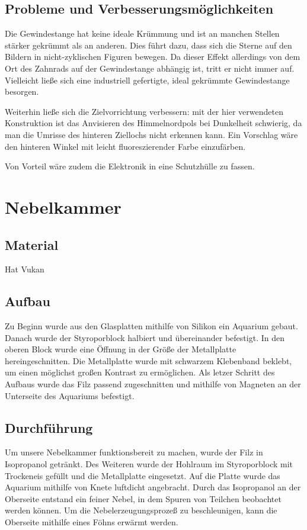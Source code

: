 \subsection{Probleme und Verbesserungsmöglichkeiten}

Die Gewindestange hat keine ideale Krümmung und ist an manchen Stellen stärker
gekrümmt als an anderen. Dies führt dazu, dass sich die Sterne auf den Bildern
in nicht-zyklischen Figuren bewegen. Da dieser Effekt allerdings von dem Ort des
Zahnrads auf der Gewindestange abhängig ist, tritt er nicht immer auf.
Vielleicht ließe sich eine industriell gefertigte, ideal gekrümmte Gewindestange
besorgen.

Weiterhin ließe sich die Zielvorrichtung verbessern: mit der hier verwendeten
Konstruktion ist das Anvisieren des Himmelnordpols bei Dunkelheit schwierig, da
man die Umrisse des hinteren Ziellochs nicht erkennen kann. Ein Vorschlag wäre
den hinteren Winkel mit leicht fluoreszierender Farbe einzufärben.

Von Vorteil wäre zudem die Elektronik in eine Schutzhülle zu fassen.

\section{Nebelkammer}

\subsection{Material}
Hat Vukan


\subsection{Aufbau}
Zu Beginn wurde aus den Glasplatten mithilfe von Silikon ein Aquarium gebaut.
Danach wurde der Styroporblock halbiert und übereinander befestigt. In den
oberen Block wurde eine Öffnung in der Größe der Metallplatte hereingeschnitten.
Die Metallplatte wurde mit schwarzem Klebenband beklebt, um einen möglichst
großen Kontrast zu ermöglichen. Als letzer Schritt des Aufbaus wurde das Filz
passend zugeschnitten und mithilfe von Magneten an der Unterseite des Aquariums
befestigt.

\subsection{Durchführung}
Um unsere Nebelkammer funktionsbereit zu machen, wurde der Filz in Isopropanol
getränkt. Des Weiteren wurde der Hohlraum im Styroporblock mit Trockeneis
gefüllt und die Metallplatte eingesetzt. Auf die Platte wurde das Aquarium
mithilfe von Knete luftdicht angebracht. Durch das Isopropanol an der Oberseite
entstand ein feiner Nebel, in dem Spuren von Teilchen beobachtet werden können.
Um die Nebelerzeugungsprozeß zu beschleunigen, kann die Oberseite mithilfe eines
Föhns erwärmt werden.

